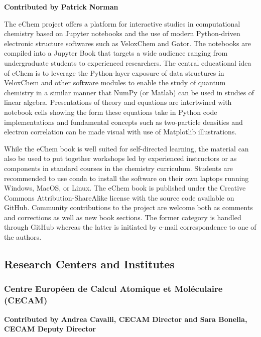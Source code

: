 \documentclass[9pt,review]{livecoms}
\begin{document}
\textbf{Contributed by Patrick Norman}

The eChem project offers a platform for interactive studies in computational chemistry based on Jupyter notebooks and the use of modern Python-driven electronic structure softwares such as VeloxChem  and Gator.  The notebooks are compiled into a Jupyter Book that targets a wide audience ranging from undergraduate students to experienced researchers.  The central educational idea of eChem is to leverage the Python-layer exposure of data structures in VeloxChem and other software modules to enable the study of quantum chemistry in a similar manner that NumPy (or Matlab) can be used in studies of linear algebra. Presentations of theory and equations are intertwined with notebook cells showing the form these equations take in Python code implementations and fundamental concepts such as two-particle densities and electron correlation can be made visual with use of Matplotlib illustrations. 

While the eChem book is well suited for self-directed learning, the material can also be used to put together workshops led by experienced instructors or as components in standard courses in the chemistry curriculum.  Students are recommended to use conda to install the software on their own laptops running Windows, MacOS, or Linux. 
The eChem book is published under the Creative Commons Attribution-ShareAlike license with the source code available on GitHub.  Community contributions to the project are welcome both as comments and corrections as well as new book sections. The former category is handled through GitHub whereas the latter is initiated by e-mail correspondence to one of the authors.



\subsection{Research Centers and Institutes}

\subsubsection{Centre Européen de Calcul Atomique et Moléculaire (CECAM)}

\textbf{Contributed by Andrea Cavalli, CECAM Director and Sara Bonella, CECAM Deputy Director}
\end{document}
